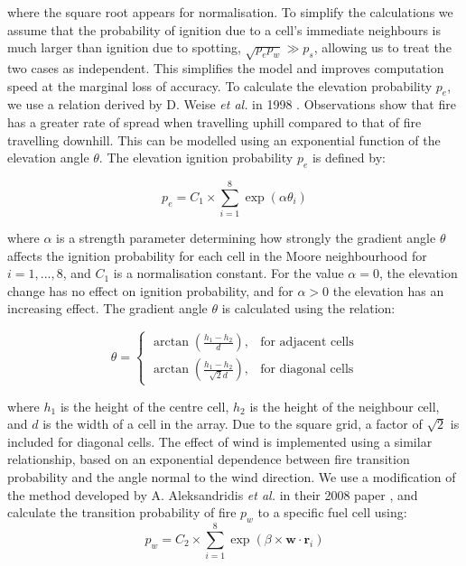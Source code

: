 \noindent where the square root appears for normalisation. To simplify the calculations we assume that the probability of ignition due to a cell's immediate neighbours is much larger than ignition due to spotting, $\sqrt{p_e p_w}\gg p_s$, allowing us to treat the two cases as independent. This simplifies the model and improves computation speed at the marginal loss of accuracy.\newline
\indent To calculate the elevation probability $p_e$, we use a relation derived by D. Weise \textit{et al.} in 1998 \cite{Weise_1998}. Observations show that fire has a greater rate of spread when travelling uphill compared to that of fire travelling downhill. This can be modelled using an exponential function of the elevation angle $\theta$. The elevation ignition probability $p_e$ is defined by:

\begin{equation}\label{p_elevation}
    p_e = C_1\times\sum_{i=1}^8\exp(\alpha\theta_i)
\end{equation}

\noindent where $\alpha$ is a strength parameter determining how strongly the gradient angle $\theta$ affects the ignition probability for each cell in the Moore neighbourhood for $i = 1,...,8$, and $C_1$ is a normalisation constant. For the value $\alpha=0$, the elevation change has no effect on ignition probability, and for $\alpha > 0$ the elevation has an increasing effect. The gradient angle $\theta$ is calculated using the relation:

\begin{equation}\label{theta_elevation}
        \theta = \begin{cases} \arctan{\left(\frac{h_1 - h_2}{d}\right)}, & \mbox{for adjacent cells} \\ \arctan{\left(\frac{h_1 - h_2}{\sqrt{2}d}\right)}, & \mbox{for diagonal cells}
     \end{cases}
\end{equation}

\noindent where $h_1$ is the height of the centre cell, $h_2$ is the height of the neighbour cell, and $d$ is the width of a cell in the array. Due to the square grid, a factor of $\sqrt{2}$ is included for diagonal cells. \newline \indent The effect of wind is implemented using a similar relationship, based on an exponential dependence between fire transition probability and the angle normal to the wind direction. We use a modification of the method developed by A. Aleksandridis \textit{et al.} in their 2008 paper \cite{Aleksandridis_2008}, and calculate the transition probability of fire $p_w$ to a specific fuel cell using:
\begin{equation} \label{p_wind}
    p_w = C_2 \times \sum_{i=1}^{8}\exp(\beta \times \mathbf{w} \cdot \mathbf{r}_i)
\end{equation}

